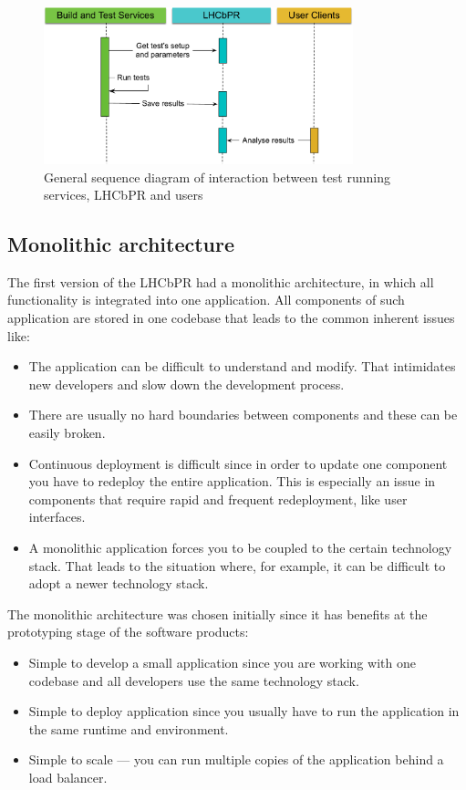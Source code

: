 \documentclass[a4paper]{jpconf}
\begin{document}
\begin{figure}[H]
\begin{minipage}{\textwidth}
\centering
\includegraphics[width=0.8\textwidth]{figs/lhcbpr-general.pdf}
\caption{\label{fig01} General sequence diagram of interaction between test
running services, LHCbPR and users}
\end{minipage}
\end{figure}

\subsection{Monolithic architecture}
The first version of the LHCbPR had a monolithic architecture, in which all
functionality is integrated into one application. All components of
such application are stored in one codebase that leads to the common inherent
issues like:
\begin{itemize}
\item The application can be difficult to understand and modify. That
intimidates new developers and slow down the development process.
\item There are usually no hard boundaries between components and these can be
easily broken.
\item Continuous deployment is difficult since in order to update one component
you have to redeploy the entire application. This is especially an issue in
components that require rapid and frequent redeployment, like user interfaces.
\item A monolithic application forces you to be coupled to the certain
technology stack. That leads to the situation where, for example, it can be
difficult to adopt a newer technology stack.
\end{itemize}

The monolithic architecture was chosen initially since it has benefits at the
prototyping stage of the software products:
\begin{itemize}
\item Simple to develop a small application since you are working with one codebase
and all developers use the same technology stack.  
\item Simple to deploy application since you usually have to run the application in the same
runtime and environment.
\item Simple to scale --- you can run multiple copies of the application behind a
load balancer.
\end{itemize}
\end{document}
